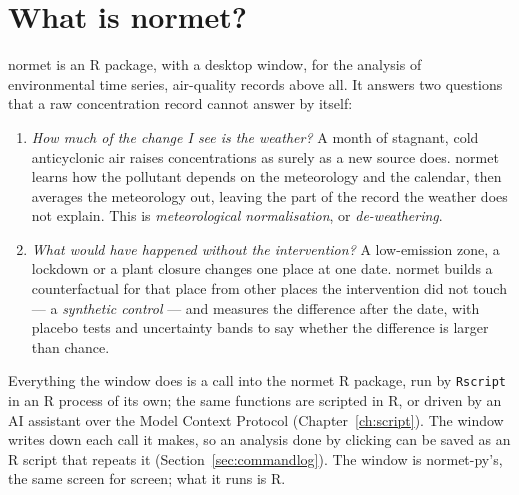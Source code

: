 \documentclass[11pt]{report}
\newcommand{\nosep}{\setlength{\itemsep}{0pt}\setlength{\parskip}{0pt}\setlength{\topsep}{2pt}}
\newcommand{\nm}{\textsf{normet}}
\newcommand{\codeunderscore}{\textunderscore\allowbreak}
\newcommand{\code}[1]{\texttt{\let\_\codeunderscore #1}}
\begin{document}
\section{What is normet?}
\nm{} is an R package, with a desktop window, for the analysis of environmental
time series, air-quality records above all. It answers two questions that a raw
concentration record cannot answer by itself:
\begin{enumerate}\nosep
  \item \emph{How much of the change I see is the weather?} A month of stagnant,
        cold anticyclonic air raises concentrations as surely as a new source does.
        \nm{} learns how the pollutant depends on the meteorology and the calendar, then
        averages the meteorology out, leaving the part of the record the weather does
        not explain. This is \emph{meteorological normalisation}, or
        \emph{de-weathering}.
  \item \emph{What would have happened without the intervention?} A low-emission
        zone, a lockdown or a plant closure changes one place at one date. \nm{}
        builds a counterfactual for that place from other places the intervention did
        not touch --- a \emph{synthetic control} --- and measures the difference after
        the date, with placebo tests and uncertainty bands to say whether the
        difference is larger than chance.
\end{enumerate}
Everything the window does is a call into the \nm{} R package, run by \code{Rscript}
in an R process of its own; the same functions are scripted in R, or driven by an AI
assistant over the Model Context Protocol (Chapter~\ref{ch:script}). The window writes
down each call it makes, so an analysis done by clicking can be saved as an R script that
repeats it (Section~\ref{sec:commandlog}). The window is normet-py's, the same screen for
screen; what it runs is R.
\end{document}
